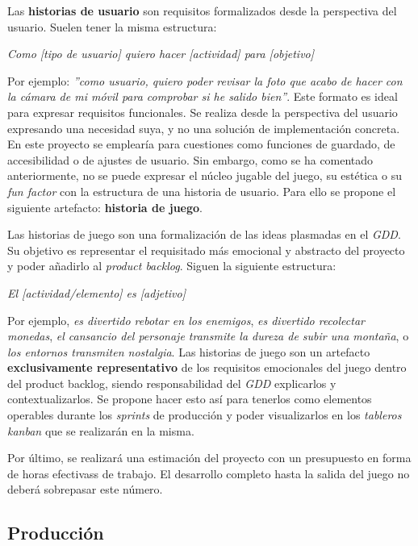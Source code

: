 Las \textbf{historias de usuario} son requisitos formalizados desde la perspectiva del usuario. Suelen tener la misma estructura:\\ 


\centerline{\textit{Como [tipo de usuario] quiero hacer [actividad] para [objetivo]}}

Por ejemplo: \textit{''como usuario, quiero poder revisar la foto que acabo de hacer con la cámara de mi móvil para comprobar si he salido bien''}. Este formato es ideal para expresar requisitos funcionales. Se realiza desde la perspectiva del usuario expresando una necesidad suya, y no una solución de implementación concreta. En este proyecto se emplearía para cuestiones como funciones de guardado, de accesibilidad o de ajustes de usuario. Sin embargo, como se ha comentado anteriormente, no se puede expresar el núcleo jugable del juego, su estética o su \textit{fun factor} con la estructura de una historia de usuario. Para ello se propone el siguiente artefacto: \textbf{historia de juego}.

Las historias de juego son una formalización de las ideas plasmadas en el \textit{GDD}. Su objetivo es representar el requisitado más emocional y abstracto del proyecto y poder añadirlo al \textit{product backlog}. Siguen la siguiente estructura:\\

\centerline{\textit{El [actividad/elemento] es [adjetivo]}}

Por ejemplo, \textit{es divertido rebotar en los enemigos}, \textit{es divertido recolectar monedas}, \textit{el cansancio del personaje transmite la dureza de subir una montaña}, o \textit{los entornos transmiten nostalgia}. Las historias de juego son un artefacto \textbf{exclusivamente representativo} de los requisitos emocionales del juego dentro del product backlog, siendo responsabilidad del \textit{GDD} explicarlos y contextualizarlos. Se propone hacer esto así para tenerlos como elementos operables durante los \textit{sprints} de producción y poder visualizarlos en los \textit{tableros kanban} que se realizarán en la misma.

Por último, se realizará una estimación del proyecto con un presupuesto en forma de horas efectivass de trabajo. El desarrollo completo hasta la salida del juego no deberá sobrepasar este número.

\subsection{Producción}

